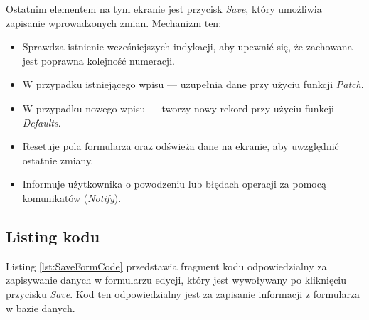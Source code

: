
Ostatnim elementem na tym ekranie jest przycisk \emph{Save}, który umożliwia zapisanie wprowadzonych zmian. Mechanizm ten:

\begin{itemize}
\item Sprawdza istnienie wcześniejszych indykacji, aby upewnić się, że zachowana jest poprawna kolejność numeracji.
\item W przypadku istniejącego wpisu — uzupełnia dane przy użyciu funkcji \emph{Patch}.
\item W przypadku nowego wpisu — tworzy nowy rekord przy użyciu funkcji \emph{Defaults}.
\item Resetuje pola formularza oraz odświeża dane na ekranie, aby uwzględnić ostatnie zmiany.
\item Informuje użytkownika o powodzeniu lub błędach operacji za pomocą komunikatów (\emph{Notify}).
\end{itemize}

\subsection{Listing kodu}

Listing \ref{lst:SaveFormCode} przedstawia fragment kodu odpowiedzialny za zapisywanie danych w formularzu edycji, który jest wywoływany po kliknięciu przycisku \emph{Save}. Kod ten odpowiedzialny jest za zapisanie informacji z formularza w bazie danych.

